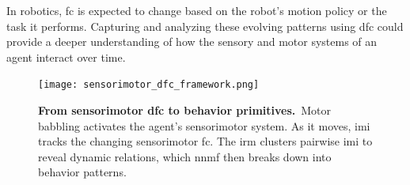 \documentclass[letterpaper, 10 pt, conference]{ieeeconf}  %
\begin{document}
In robotics, \ac{fc} is expected to change based on the robot’s motion policy or the task it performs. Capturing and analyzing these evolving patterns using \ac{dfc} could provide a deeper understanding of how the sensory and motor systems of an agent interact over time.

\begin{figure}[h!]
	\centering
	\texttt{[image: sensorimotor\_dfc\_framework.png]}
	\caption{\textbf{From sensorimotor \acl{dfc} to behavior primitives.}~Motor babbling activates the agent's sensorimotor system. As it moves, \ac{imi} tracks the changing sensorimotor \ac{fc}. The \ac{irm} clusters pairwise \ac{imi} to reveal dynamic relations, which \ac{nnmf} then breaks down into behavior patterns.}    
	\label{fig:framework_overview}
\end{figure}

\end{document}
